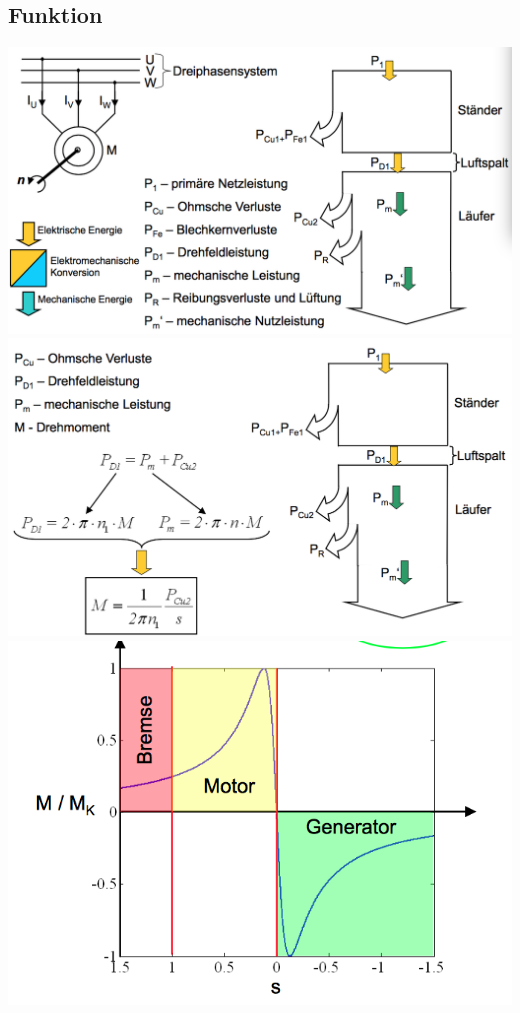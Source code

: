 \subsection{Funktion}
\begin{minipage}{0.4 \linewidth}
\includegraphics[width = \linewidth]{./Pics/VL1213/Funktion}
\includegraphics[width = \linewidth]{./Pics/VL1213/Funktion2}
\includegraphics[width = \linewidth]{./Pics/VL1213/Funktion3}

\end{minipage}
